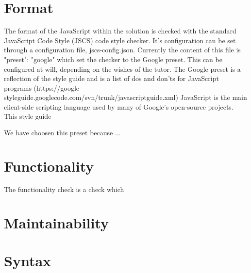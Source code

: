 % 


\section{Format}

The format of the JavaScript within the solution is checked with the standard
JavaScript Code Style (JSCS) code style checker.
It's configuration can be set through a configuration file, jscs-config.json.
Currently the content of this file is {"preset": "google"} which set the checker
to the Google preset.
This can be configured at will, depending on the wishes of the tutor.
The Google preset is a reflection of the style guide and is a list of dos and
don'ts for JavaScript programs
(https://google-styleguide.googlecode.com/svn/trunk/javascriptguide.xml)
JavaScript is the main client-side scripting language used by many of Google's
open-source projects. This style guide 

We have choosen this preset because ...



\section{Functionality}

The functionality check is a check which 


\section{Maintainability}


\section{Syntax}


